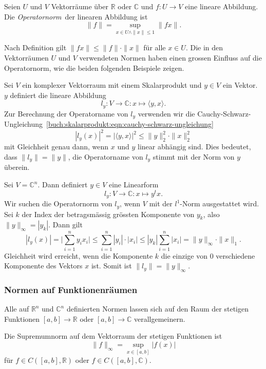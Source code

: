 \begin{definition}
Seien $U$ und $V$ Vektorräume über $\mathbb{R}$ oder $\mathbb{C}$ und
$f\colon U\to V$ eine lineare Abbildung.
Die {\em Operatornorm} der linearen Abbildung ist 
%
\[
\|f\|
=
\sup_{x\in U\wedge \|x\|\le 1} \|fx\|.
\]
\end{definition}

Nach Definition gilt $\|fx\| \le \|f\|\cdot \|x\|$ für alle $x\in U$.
Die in den Vektorräumen $U$ und $V$ verwendeten Normen haben einen
grossen Einfluss auf die Operatornorm, wie die beiden folgenden
Beispiele zeigen.

\begin{beispiel}
Sei $V$ ein komplexer Vektorraum mit einem Skalarprodukt und $y\in V$ ein
Vektor.
$y$ definiert die lineare Abbildung
\[
l_y
\colon
V\to \mathbb{C}: x\mapsto \langle y,x\rangle.
\]
Zur Berechnung der Operatorname von $l_y$ verwenden wir die
Cauchy-Schwarz-Ungleichung~\eqref{buch:skalarprodukt:eqn:cauchy-schwarz-ungleichung}
\[
|l_y(x)|^2
=
|\langle y,x\rangle|^2
\le
\|y\|_2^2\cdot \|x\|_2^2
\]
mit Gleichheit genau dann, wenn $x$ und $y$ linear abhängig sind.
Dies bedeutet, dass
$\|l_y\|=\|y\|$, die Operatorname von $l_y$ stimmt mit der Norm von $y$
überein.
\end{beispiel}

\begin{beispiel}
Sei $V=\mathbb{C}^n$. 
Dann definiert $y\in V$ eine Linearform
\[
l_y
\colon
V\to \mathbb C
:
x\mapsto y^tx.
\]
Wir suchen  die Operatornorm von $l_y$, wenn $V$ mit der $l^1$-Norm
ausgestattet wird.
Sei $k$ der Index der betragsmässig grössten Komponente von $y_k$,
also $\| y\|_\infty = |y_k|$.
Dann gilt
\[
|l_y(x)|
=
\biggl|\sum_{i=1}^n y_ix_i\biggr|
\le
\sum_{i=1}^n |y_i|\cdot |x_i|
\le
|y_k| \sum_{i=1}^n |x_i|
=
\|y\|_\infty\cdot \|x\|_1.
\]
Gleichheit wird erreicht, wenn die Komponente $k$ die einzige
von $0$ verschiedene Komponente des Vektors $x$ ist.
Somit ist $\|l_y\| = \|y\|_\infty$.
\end{beispiel}


\subsubsection{Normen auf Funktionenräumen}
Alle auf $\mathbb{R}^n$ und $\mathbb{C}^n$ definierten Normen lassen
sich auf den Raum der stetigen Funktionen $[a,b]\to\mathbb{R}$ oder
$[a,b]\to\mathbb{C}$ verallgemeinern.

Die Supremumnorm auf dem Vektorraum der stetigen Funktionen ist
%
\[
\|f\|_\infty = \sup_{x\in[a,b]} |f(x)|
\]
für $f\in C([a,b],\mathbb{R})$ oder $f\in C([a,b],\mathbb{C})$.

